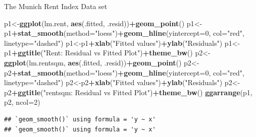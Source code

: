 \documentclass[
  ignorenonframetext,
]{beamer}
\newenvironment{Shaded}{\begin{snugshade}}{\end{snugshade}}
\newcommand{\AttributeTok}[1]{\textcolor[rgb]{0.13,0.29,0.53}{#1}}
\newcommand{\DecValTok}[1]{\textcolor[rgb]{0.00,0.00,0.81}{#1}}
\newcommand{\FunctionTok}[1]{\textcolor[rgb]{0.13,0.29,0.53}{\textbf{#1}}}
\newcommand{\NormalTok}[1]{#1}
\newcommand{\OtherTok}[1]{\textcolor[rgb]{0.56,0.35,0.01}{#1}}
\newcommand{\SpecialCharTok}[1]{\textcolor[rgb]{0.81,0.36,0.00}{\textbf{#1}}}
\newcommand{\StringTok}[1]{\textcolor[rgb]{0.31,0.60,0.02}{#1}}
\begin{document}
\begin{frame}[fragile]
\begin{block}{The Munich Rent Index Data set}
\begin{Shaded}
\begin{Highlighting}[]
\NormalTok{p1}\OtherTok{\textless{}{-}}\FunctionTok{ggplot}\NormalTok{(lm.rent, }\FunctionTok{aes}\NormalTok{(.fitted, .resid))}\SpecialCharTok{+}\FunctionTok{geom\_point}\NormalTok{()}
\NormalTok{p1}\OtherTok{\textless{}{-}}\NormalTok{p1}\SpecialCharTok{+}\FunctionTok{stat\_smooth}\NormalTok{(}\AttributeTok{method=}\StringTok{"loess"}\NormalTok{)}\SpecialCharTok{+}\FunctionTok{geom\_hline}\NormalTok{(}\AttributeTok{yintercept=}\DecValTok{0}\NormalTok{, }\AttributeTok{col=}\StringTok{"red"}\NormalTok{, }\AttributeTok{linetype=}\StringTok{"dashed"}\NormalTok{)}
\NormalTok{p1}\OtherTok{\textless{}{-}}\NormalTok{p1}\SpecialCharTok{+}\FunctionTok{xlab}\NormalTok{(}\StringTok{"Fitted values"}\NormalTok{)}\SpecialCharTok{+}\FunctionTok{ylab}\NormalTok{(}\StringTok{"Residuals"}\NormalTok{)}
\NormalTok{p1}\OtherTok{\textless{}{-}}\NormalTok{p1}\SpecialCharTok{+}\FunctionTok{ggtitle}\NormalTok{(}\StringTok{"Rent: Residual vs Fitted Plot"}\NormalTok{)}\SpecialCharTok{+}\FunctionTok{theme\_bw}\NormalTok{()}
\NormalTok{p2}\OtherTok{\textless{}{-}}\FunctionTok{ggplot}\NormalTok{(lm.rentsqm, }\FunctionTok{aes}\NormalTok{(.fitted, .resid))}\SpecialCharTok{+}\FunctionTok{geom\_point}\NormalTok{()}
\NormalTok{p2}\OtherTok{\textless{}{-}}\NormalTok{p2}\SpecialCharTok{+}\FunctionTok{stat\_smooth}\NormalTok{(}\AttributeTok{method=}\StringTok{"loess"}\NormalTok{)}\SpecialCharTok{+}\FunctionTok{geom\_hline}\NormalTok{(}\AttributeTok{yintercept=}\DecValTok{0}\NormalTok{, }\AttributeTok{col=}\StringTok{"red"}\NormalTok{, }\AttributeTok{linetype=}\StringTok{"dashed"}\NormalTok{)}
\NormalTok{p2}\OtherTok{\textless{}{-}}\NormalTok{p2}\SpecialCharTok{+}\FunctionTok{xlab}\NormalTok{(}\StringTok{"Fitted values"}\NormalTok{)}\SpecialCharTok{+}\FunctionTok{ylab}\NormalTok{(}\StringTok{"Residuals"}\NormalTok{)}
\NormalTok{p2}\OtherTok{\textless{}{-}}\NormalTok{p2}\SpecialCharTok{+}\FunctionTok{ggtitle}\NormalTok{(}\StringTok{"rentsqm: Residual vs Fitted Plot"}\NormalTok{)}\SpecialCharTok{+}\FunctionTok{theme\_bw}\NormalTok{()}
\FunctionTok{ggarrange}\NormalTok{(p1, p2, }\AttributeTok{ncol=}\DecValTok{2}\NormalTok{)}
\end{Highlighting}
\end{Shaded}

\begin{verbatim}
## `geom_smooth()` using formula = 'y ~ x'
## `geom_smooth()` using formula = 'y ~ x'
\end{verbatim}


\end{block}
\end{frame}
\end{document}
